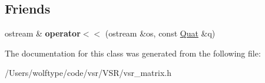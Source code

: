 \subsection*{Friends}
\begin{DoxyCompactItemize}
\item 
\hypertarget{classvsr_1_1_quat_a30fb640244c49adab1da0dd3242a3e45}{ostream \& {\bfseries operator$<$$<$} (ostream \&os, const \hyperlink{classvsr_1_1_quat}{Quat} \&q)}\label{classvsr_1_1_quat_a30fb640244c49adab1da0dd3242a3e45}

\end{DoxyCompactItemize}


The documentation for this class was generated from the following file\-:\begin{DoxyCompactItemize}
\item 
/\-Users/wolftype/code/vsr/\-V\-S\-R/vsr\-\_\-matrix.\-h\end{DoxyCompactItemize}
